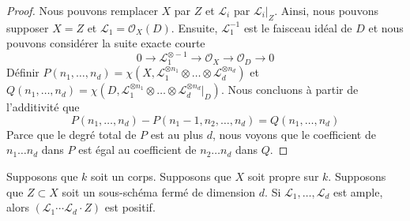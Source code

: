 \begin{proof}
Nous pouvons remplacer $X$ par $Z$ et $\mathcal{L}_i$ par
$\mathcal{L}_i|_Z$. Ainsi, nous pouvons supposer $X = Z$ et
$\mathcal{L}_1 = \mathcal{O}_X(D)$. Ensuite, $\mathcal{L}_1^{-1}$ est le
faisceau idéal de $D$ et nous pouvons considérer la suite exacte courte
$$
0 \to \mathcal{L}_1^{\otimes -1} \to \mathcal{O}_X \to \mathcal{O}_D \to 0
$$
Définir $P(n_1, \ldots, n_d) =
\chi(X, \mathcal{L}_1^{\otimes
n_1} \otimes \ldots \otimes
\mathcal{L}_d^{\otimes n_d})$ et
$Q(n_1, \ldots, n_d) = \chi(D,
\mathcal{L}_1^{\otimes n_1}
\otimes \ldots \otimes
\mathcal{L}_d^{\otimes n_d}|_D)$. Nous
concluons à partir de l'additivité que
$$
P(n_1, \ldots, n_d) - P(n_1 - 1, n_2, \ldots, n_d) =
Q(n_1, \ldots, n_d)
$$
Parce que le degré total de $P$ est au plus $d$, nous
voyons que le coefficient de $n_1 \ldots n_d$ dans $P$
est égal au coefficient de $n_2 \ldots n_d$ dans $Q$.
\end{proof}

\begin{lemma}
\label{lemma-ample-positive}
Supposons que $k$ soit un corps. Supposons que $X$ soit propre sur $k$. Supposons que
$Z \subset X$ soit un sous-schéma fermé de dimension $d$. Si $\mathcal{L}_1, \ldots,
\mathcal{L}_d$ est ample, alors $(\mathcal{L}_1 \cdots \mathcal{L}_d \cdot Z)$ est positif.
\end{lemma}


